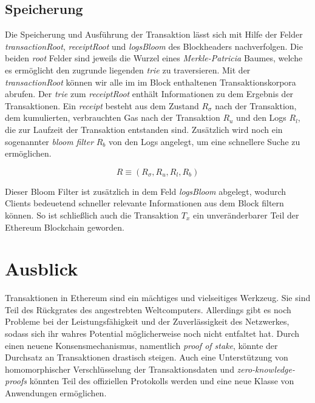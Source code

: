 \documentclass[runningheads]{llncs}
\begin{document}
\subsection{Speicherung}
Die Speicherung und Ausführung der Transaktion lässt sich mit Hilfe der Felder \textit{transactionRoot}, \textit{receiptRoot} und \textit{logsBloom} des Blockheaders nachverfolgen. Die beiden \textit{root} Felder sind jeweils die Wurzel eines \textit{Merkle-Patricia} Baumes, welche es ermöglicht den zugrunde liegenden \textit{trie} zu traversieren. \cite{noauthor_ethereum/patricia_nodate} Mit der \textit{transactionRoot} können wir alle  im im Block enthaltenen Transaktionskorpora abrufen. Der \textit{trie} zum \textit{receiptRoot} enthält Informationen zu dem Ergebnis der Transaktionen. Ein \textit{receipt} besteht aus dem Zustand $ R_{\sigma} $ nach der Transaktion, dem kumulierten, verbrauchten Gas nach der Transaktion $ R_u $ und den Logs $ R_l $, die zur Laufzeit der Transaktion entstanden sind. Zusätzlich wird noch ein sogenannter \textit{bloom filter} $ R_b $ von den Logs angelegt, um eine schnellere Suche zu ermöglichen. \cite{noauthor_logs_nodate}

$$
  R \equiv (R_{\sigma}, R_u, R_l, R_b)
$$

Dieser Bloom Filter ist zusätzlich in dem Feld \textit{logsBloom} abgelegt, wodurch Clients bedeuetend schneller relevante Informationen aus dem Block filtern können. \cite[S. 5]{wood_ethereum_nodate} So ist schließlich auch die Transaktion $ T_x $ ein unveränderbarer Teil der Ethereum Blockchain geworden.

\section{Ausblick}
Transaktionen in Ethereum sind ein mächtiges und vielseitiges Werkzeug. Sie sind Teil des Rückgrates des angestrebten Weltcomputers. Allerdings gibt es noch Probleme bei der Leistungsfähigkeit und der Zuverlässigkeit des Netzwerkes, sodass sich ihr wahres Potential möglicherweise noch nicht entfaltet hat. Durch einen neuene Konsensmechanismus, namentlich \textit{proof of stake}, könnte der Durchsatz an Transaktionen drastisch steigen. Auch eine Unterstützung von homomorphischer Verschlüsselung der Transaktionsdaten und \textit{zero-knowledge-proofs} könnten Teil des offiziellen Protokolls werden und eine neue Klasse von Anwendungen ermöglichen.



\end{document}
